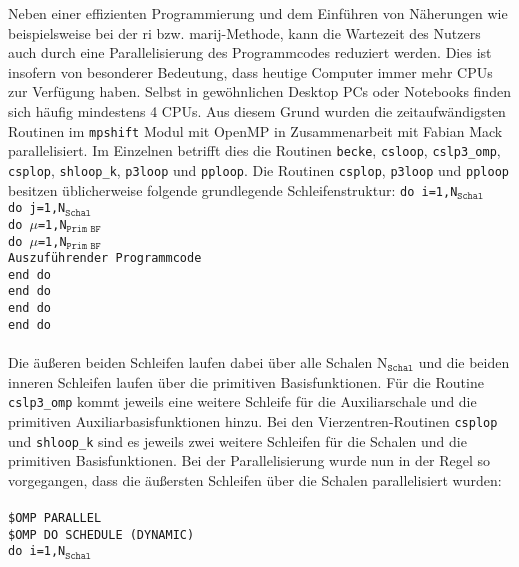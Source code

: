 \bigskip
Neben einer effizienten Programmierung und dem Einführen von Näherungen wie beispielsweise bei der \ac{ri} bzw. \ac{marij}-Methode, kann die Wartezeit des Nutzers auch durch eine Parallelisierung des Programmcodes reduziert werden. Dies ist insofern von besonderer Bedeutung, dass heutige Computer immer mehr CPUs zur Verfügung haben. Selbst in gewöhnlichen Desktop PCs oder Notebooks finden sich häufig mindestens 4 CPUs. Aus diesem Grund wurden die zeitaufwändigsten Routinen im \texttt{mpshift} Modul mit OpenMP\supercite{dagum1998openmp} in Zusammenarbeit mit Fabian Mack parallelisiert. Im Einzelnen betrifft dies die Routinen \texttt{becke}, \texttt{csloop}, \texttt{cslp3\_omp}, \texttt{csplop}, \texttt{shloop\_k}, \texttt{p3loop} und \texttt{pploop}. Die Routinen \texttt{csplop}, \texttt{p3loop} und \texttt{pploop} besitzen üblicherweise folgende grundlegende Schleifenstruktur:
\vfill
\newpage
\texttt{do i=1,N$_{\texttt{Schal}}$}\\ 
\null\quad\texttt{do j=1,N$_{\texttt{Schal}}$}\\ 
\null\quad\quad\texttt{do $\mu$=1,N$_{\texttt{Prim BF}}$}\\ 
\null\quad\quad\quad\texttt{do $\mu$=1,N$_{\texttt{Prim BF}}$}\\
\null\quad\quad\quad\quad \texttt{Auszuführender Programmcode}\\ 
\null\quad\quad\quad\texttt{end do}\\ 
\null\quad\quad\texttt{end do}\\ 
\null\quad\texttt{end do}\\ 
\texttt{end do}\\
\\
Die äußeren beiden Schleifen laufen dabei über alle Schalen N$_{\texttt{Schal}}$ und die beiden inneren Schleifen laufen über die primitiven Basisfunktionen. Für die Routine \texttt{cslp3\_omp} kommt jeweils eine weitere Schleife für die Auxiliarschale und die primitiven Auxiliarbasisfunktionen hinzu. Bei den Vierzentren-Routinen \texttt{csplop} und \texttt{shloop\_k} sind es jeweils zwei weitere Schleifen für die Schalen und die primitiven Basisfunktionen. Bei der Parallelisierung wurde nun in der Regel so vorgegangen, dass die äußersten Schleifen über die Schalen parallelisiert wurden:\\
\\
\texttt{\$OMP PARALLEL}\\
\texttt{\$OMP DO SCHEDULE (DYNAMIC)}\\
\texttt{do i=1,N$_{\texttt{Schal}}$}\\ 
